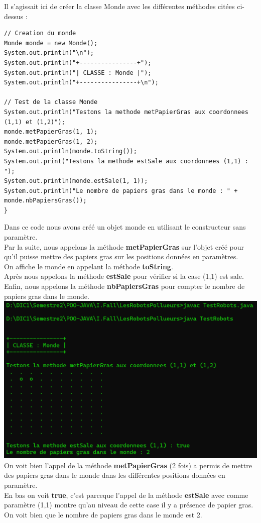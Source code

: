 \documentclass{article}
\begin{document}
Il s'agissait ici de créer la classe Monde avec les différentes méthodes citées ci-dessus :
\begin{lstlisting}
// Creation du monde
Monde monde = new Monde();
System.out.println("\n");
System.out.println("+----------------+");
System.out.println("| CLASSE : Monde |");
System.out.println("+----------------+\n");

// Test de la classe Monde
System.out.println("Testons la methode metPapierGras aux coordonnees (1,1) et (1,2)");
monde.metPapierGras(1, 1);
monde.metPapierGras(1, 2);
System.out.println(monde.toString());
System.out.print("Testons la methode estSale aux coordonnees (1,1) : ");
System.out.println(monde.estSale(1, 1));
System.out.println("Le nombre de papiers gras dans le monde : " + monde.nbPapiersGras());
}\end{lstlisting}
Dans ce code nous avons créé un objet monde en utilisant le constructeur sans paramètre.\\
Par la suite, nous appelons la méthode \textbf{metPapierGras} sur l'objet créé pour qu'il puisse mettre des papiers gras sur les positions données en paramètres.\\
On affiche le monde en appelant la méthode \textbf{toString}.\\
Après nous appelons la méthode \textbf{estSale} pour vérifier si la case (1,1) est sale. \\
Enfin, nous appelons la méthode \textbf{nbPapiersGras} pour compter le nombre de papiers gras dans le monde.\\

\includegraphics[scale=0.5]{../images/exo1.png}\\

On voit bien l'appel de la méthode \textbf{metPapierGras} (2 fois) a permis de mettre des papiers gras dans le monde dans les différentes positions données en paramètre.\\
En bas on voit \textbf{true}, c'est parceque l'appel de la méthode \textbf{estSale} avec comme paramètre (1,1) montre qu'au niveau de cette case il y a présence de papier gras.\\
On voit bien que le nombre de papiers gras dans le monde est 2.
\end{document}
